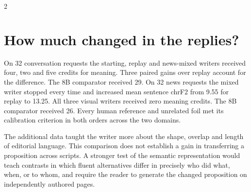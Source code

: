 \begin{multicols}{2}
\section*{How much changed in the replies?}
On 32 conversation requests the starting, replay and news-mixed writers received four, two and five credits for meaning. Three paired gains over replay account for the difference. The 8B comparator received 29. On 32 news requests the mixed writer stopped every time and increased mean sentence chrF2 from 9.55 for replay to 13.25. All three visual writers received zero meaning credits. The 8B comparator received 26. Every human reference and unrelated foil met its calibration criterion in both orders across the two domains.
\par The additional data taught the writer more about the shape, overlap and length of editorial language. This comparison does not establish a gain in transferring a proposition across scripts. A stronger test of the semantic representation would teach contrasts in which fluent alternatives differ in precisely who did what, when, or to whom, and require the reader to generate the changed proposition on independently authored pages.
\end{multicols}
